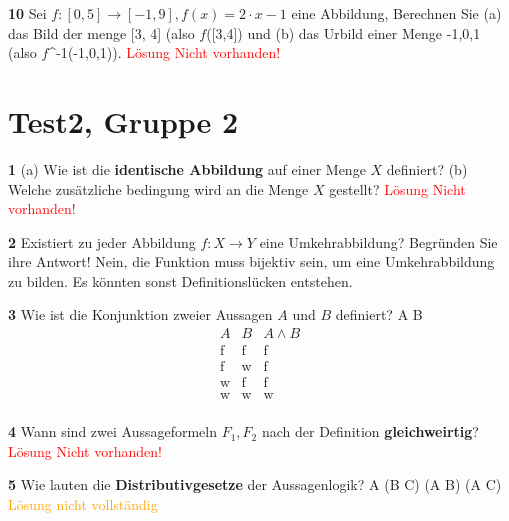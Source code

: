 \documentclass[11pt]{article}
\begin{document}
\textbf{10} Sei $f : [0,5] \rightarrow [-1,9], f(x) = 2 \cdot x - 1$ eine Abbildung, Berechnen Sie (a) das Bild der menge [3, 4] (also $f$([3,4]) und (b) das Urbild einer Menge {-1,0,1} (also $f$^{-1}({-1,0,1})).\newline
    \textcolor{red}{Lösung Nicht vorhanden!}\newline

\section{Test2, Gruppe 2}

    \textbf{1} (a) Wie ist die \textbf{identische Abbildung} auf einer Menge $X$ definiert? (b) Welche zusätzliche bedingung wird an die Menge $X$ gestellt?\newline
    \textcolor{red}{Lösung Nicht vorhanden!}\newline

    \textbf{2} Existiert zu jeder Abbildung $f : X \rightarrow Y $ eine Umkehrabbildung? Begründen Sie ihre Antwort!\newline
    Nein, die Funktion muss bijektiv sein, um eine Umkehrabbildung zu bilden. Es könnten sonst Definitionslücken entstehen.\newline

    \textbf{3} Wie ist die Konjunktion zweier Aussagen $A$ und $B$ definiert?\newline
    A \land B 
    \[
        \begin{array}{c|c|c}
            A & B & A \land B \\
            \hline
            \text{f} & \text{f} & \text{f} \\
            \text{f} & \text{w} & \text{f} \\
            \text{w} & \text{f} & \text{f} \\
            \text{w} & \text{w} & \text{w} \\
        \end{array}
    \]\newline\newline


    \textbf{4} Wann sind zwei Aussageformeln $F_1, F_2$ nach der Definition \textbf{gleichweirtig}?\newline
    \textcolor{red}{Lösung Nicht vorhanden!}\newline

    \textbf{5} Wie lauten die \textbf{Distributivgesetze} der Aussagenlogik?\newline
    A \land (B \lor C) \iff (A \land B) \lor (A \land C)\newline
    \textcolor{orange}{Lösung nicht vollständig}\newline
\end{document}
